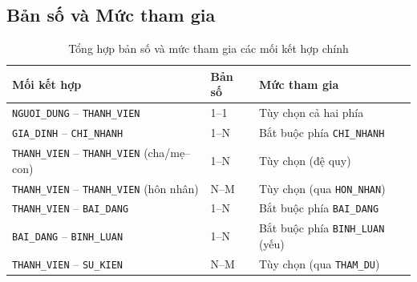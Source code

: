 \subsection{Bản số và Mức tham gia}
\begin{table}[H]
\centering
\begin{tabular}{|l|l|l|}
\hline
\textbf{Mối kết hợp} & \textbf{Bản số} & \textbf{Mức tham gia} \\
\hline
\texttt{NGUOI\_DUNG} -- \texttt{THANH\_VIEN} & 1--1 & Tùy chọn cả hai phía \\
\texttt{GIA\_DINH} -- \texttt{CHI\_NHANH} & 1--N & Bắt buộc phía \texttt{CHI\_NHANH} \\
\texttt{THANH\_VIEN} -- \texttt{THANH\_VIEN} (cha/mẹ--con) & 1--N & Tùy chọn (đệ quy) \\
\texttt{THANH\_VIEN} -- \texttt{THANH\_VIEN} (hôn nhân) & N--M & Tùy chọn (qua \texttt{HON\_NHAN}) \\
\texttt{THANH\_VIEN} -- \texttt{BAI\_DANG} & 1--N & Bắt buộc phía \texttt{BAI\_DANG} \\
\texttt{BAI\_DANG} -- \texttt{BINH\_LUAN} & 1--N & Bắt buộc phía \texttt{BINH\_LUAN} (yếu) \\
\texttt{THANH\_VIEN} -- \texttt{SU\_KIEN} & N--M & Tùy chọn (qua \texttt{THAM\_DU}) \\
\hline
\end{tabular}
\caption{Tổng hợp bản số và mức tham gia các mối kết hợp chính}
\label{tab:banso_familyconnect}
\end{table}
